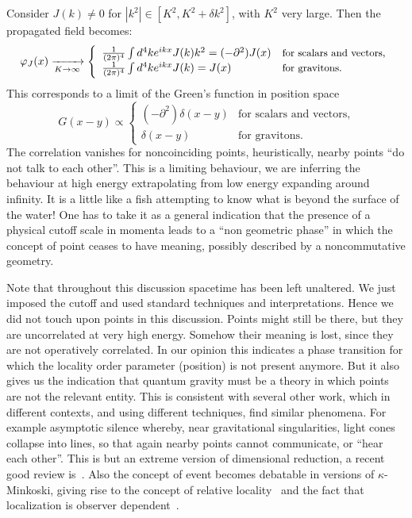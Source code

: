 \documentclass[12pt,a4paper]{article}
\newcommand{\be}{\begin{equation}}
\newcommand{\ee}{\end{equation}}
\newcommand{\del}{\partial}
\newcommand{\formula}[1]{\be #1 \ee}
\newcommand{\formu}[1]{$  #1$}
\begin{document}
Consider \formu{J(k)\neq 0} for \formu{|k^2|\in[K^2,K^2+\delta k^2]}, with \formu{K^2} very large. 
Then the propagated field becomes:
\formula{
\varphi_J(x) \xrightarrow[{{\scriptstyle K\to\infty}}]{}
\left\{\begin{array}{ll} \frac1{(2\pi)^4}\int d^4k e^{ikx} J(k) k^2=(-\del^2)J(x)  & \mbox{\small for scalars and vectors,}  \\
\frac1{(2\pi)^4}\int d^4k e^{ikx} J(k) =J(x)  & \mbox{\small for gravitons.} 
\end{array}
\right .
}
This  corresponds to a limit of the Green's function in position space
\formula{
G(x-y)\propto\left\{\begin{array}{ll} (-\del^2)\delta\left(x-y\right)   & \mbox{for scalars and vectors,}  \\
\delta\left(x-y\right)  & \mbox{for gravitons.} 
\end{array}
\right. }
The correlation vanishes for noncoinciding points, heuristically, nearby points ``do not talk to each other''.
This is a limiting behaviour, we are inferring the behaviour at high energy extrapolating from low energy expanding around infinity. It is a little like a fish attempting to know what is beyond the surface of the water!
One has to take it as a general indication that the presence of a physical cutoff scale in momenta leads to a ``non geometric phase'' in which the concept of point ceases to have meaning, possibly described by a noncommutative geometry.

Note that throughout this discussion spacetime has been left unaltered. We just imposed the cutoff and used standard techniques and interpretations. Hence we did not touch upon points in this discussion.  Points might still be there, but they are uncorrelated at very high energy. Somehow their meaning is lost, since they are not operatively correlated. In our opinion this indicates a phase transition for which the locality order parameter (position) is not present anymore.
 But it also gives us the indication that quantum gravity must be a theory in which points are not the relevant entity.
This is consistent with several other work, which in different contexts, and using different techniques, find similar phenomena. For example asymptotic silence whereby, near gravitational singularities, light cones collapse into lines, so that again nearby points cannot communicate, or ``hear each other''.  This is but an extreme version of dimensional reduction, a recent good review is~\cite{Carlip}. Also the concept of event becomes debatable in versions of $\kappa$-Minkoski, giving rise to the concept of relative locality~\cite{relaloc} and the fact that localization is observer dependent~\cite{LMM}.
\end{document}
